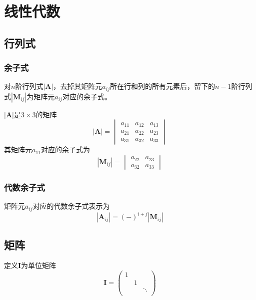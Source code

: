 \chapter{线性代数}

\section{行列式}

\subsection{余子式}
对$n$阶行列式$|\bm{A}|$，去掉其矩阵元$a_{ij}$所在行和列的所有元素后，留下的$n-1$阶行列式$|\bm{M}_{ij}|$为矩阵元$a_{ij}$对应的余子式。

\begin{example}
    $|\bm{A}|$是$3\times 3$的矩阵
    \begin{equation*}
    |\bm{A}| = \begin{vmatrix}
        a_{11} & a_{12} & a_{13} \\
        a_{21} & a_{22} & a_{23} \\
        a_{31} & a_{32} & a_{33}
    \end{vmatrix}
    \end{equation*}
    其矩阵元$a_{11}$对应的余子式为
    \begin{equation*}
    |\bm{M}_{ij}| = \begin{vmatrix}
        a_{22} & a_{23} \\
        a_{32} & a_{33}
    \end{vmatrix}
    \end{equation*}
\end{example}

\subsection{代数余子式}
矩阵元$a_{ij}$对应的代数余子式表示为
\begin{equation}
    |\bm{A}_{ij}| = (-)^{i+j} |\bm{M}_{ij}|
\end{equation}

\section{矩阵}

定义$\bm{I}$为单位矩阵
\begin{equation}
    \bm{I} = \begin{pmatrix}
        1 &   &          \\
          & 1 &          \\
          &   &  \ddots  \\
    \end{pmatrix}
\end{equation}

